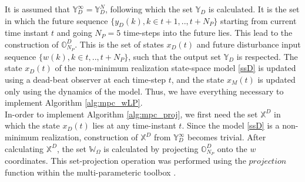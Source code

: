 \documentclass[letterpaper, 10 pt, conference]{ieeeconf}  %
\begin{document}
It is assumed that $\mathbb{Y}_D^{\infty}=\mathbb{Y}_D^N$, following which the set $\mathbb{Y}_D$ is calculated. It is the set in which the future sequence $\{y_D(k),k \in t+1,..,t+N_P\}$ starting from current time instant $t$ and going $N_P=5$ time-steps into the future lies. This lead to the construction of $\mathbb{O}_{N_P}^D$. This is the set of states $x_D(t)$ and future disturbance input sequence $\{w(k),k \in t,..,t+N_P\}$, such that the output set $\mathbb{Y}_D$ is respected. The state $x_D(t)$ of the non-minimum realization state-space model \eqref{ssD} is updated using a dead-beat observer at each time-step $t$, and the state $x_M(t)$ is updated only using the dynamics of the model. Thus, we have everything necessary to implement Algorithm \ref{alg:mpc_wLP}.
\\
\indent
In-order to implement Algorithm \ref{alg:mpc_proj}, we first need the set $\mathbb{X}^D$ in which the state $x_D(t)$ lies at any time-instant $t$. Since the model \eqref{ssD} is a non-minimum realization, construction of $\mathbb{X}^D$ from $\mathbb{Y}_D^{\infty}$ becomes trivial. After calculating $\mathbb{X}^D$, the set $\mathbb{W}_{\Omega}$ is calculated by projecting $\mathbb{O}_{N_P}^D$ onto the $w$ coordinates. This set-projection operation was performed using the $projection$ function within the multi-parameteric toolbox \cite{mpt}.

\end{document}
